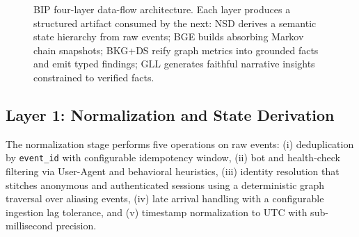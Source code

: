 \documentclass[12pt, a4paper]{article}
\begin{document}
\begin{figure}[htbp]
\centering
{}
\caption{BIP four-layer data-flow architecture. Each layer produces a structured
artifact consumed by the next: NSD derives a semantic state hierarchy from raw
events; BGE builds absorbing Markov chain snapshots; BKG+DS reify graph metrics
into grounded facts and emit typed findings; GLL generates faithful narrative
insights constrained to verified facts.}
\label{fig:architecture}
\end{figure}

\subsection{Layer 1: Normalization and State Derivation}

The normalization stage performs five operations on raw events: (i) deduplication by \texttt{event\_id} with configurable idempotency window, (ii) bot and health-check filtering via User-Agent and behavioral heuristics, (iii) identity resolution that stitches anonymous and authenticated sessions using a deterministic graph traversal over aliasing events, (iv) late arrival handling with a configurable ingestion lag tolerance, and (v) timestamp normalization to UTC with sub-millisecond precision.
\end{document}
